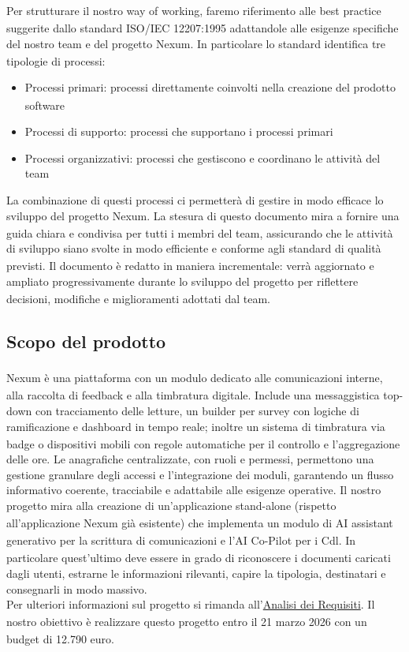 \documentclass[a4paper,11pt]{article}
\newcommand{\G}{\textsubscript{\scalebox{0.6}{\textbf{G}}}}
\begin{document}
Per strutturare il nostro way of working\G{}, faremo riferimento alle best practice\G{} suggerite dallo standard ISO/IEC 12207:1995
adattandole alle esigenze specifiche del nostro team e del progetto\G{} Nexum. In particolare lo standard identifica tre tipologie di processi:
\begin{itemize}
    \item Processi primari{}: processi direttamente coinvolti nella creazione del prodotto\G{} software
    \item Processi di supporto{}: processi che supportano i processi primari{}
    \item Processi organizzativi{}: processi che gestiscono e coordinano le attività del team
\end{itemize}
La combinazione di questi processi ci permetterà di gestire in modo efficace lo sviluppo del progetto\G{} Nexum. 
La stesura di questo documento mira a fornire una guida chiara e condivisa per tutti i membri del team, 
assicurando che le attività di sviluppo siano svolte in modo efficiente e conforme agli standard di qualità\G{} 
previsti. Il documento è redatto in maniera incrementale: verrà aggiornato e ampliato progressivamente durante 
lo sviluppo del progetto\G{} per riflettere decisioni, modifiche e miglioramenti adottati dal team.


\subsection{Scopo del prodotto\G{}}
Nexum è una piattaforma con un modulo\G{} dedicato alle comunicazioni interne, alla raccolta di feedback e alla timbratura digitale.
Include una messaggistica top-down con tracciamento delle letture, un builder per survey con logiche di ramificazione e dashboard\G{} 
in tempo reale; inoltre un sistema di timbratura via badge o dispositivi mobili con regole automatiche per il controllo e l'aggregazione delle ore.
Le anagrafiche centralizzate, con ruoli e permessi, permettono una gestione granulare degli accessi e l'integrazione dei moduli, 
garantendo un flusso informativo coerente, tracciabile e adattabile alle esigenze operative.
Il nostro progetto\G{} mira alla creazione di un'applicazione stand-alone\G{} (rispetto all'applicazione Nexum già esistente) che implementa un modulo\G{} di AI\G{} assistant generativo per la scrittura di comunicazioni e l'AI Co-Pilot\G{} per
i Cdl\G{}. In particolare quest'ultimo deve essere in grado di riconoscere i documenti caricati dagli utenti, estrarne le informazioni rilevanti, capire
la tipologia, destinatari e consegnarli in modo massivo. \\
Per ulteriori informazioni sul progetto\G{} si rimanda all'\href{https://bugbustersunipd.github.io/DocumentazioneSWE/PB/ANALISI%20DEI%20REQUISITI/Analisi%20dei%20Requisiti.pdf}{Analisi dei Requisiti\G{}}.
Il nostro obiettivo è realizzare questo progetto\G{} entro il 21 marzo 2026 con un budget di 12.790 euro.
\end{document}
